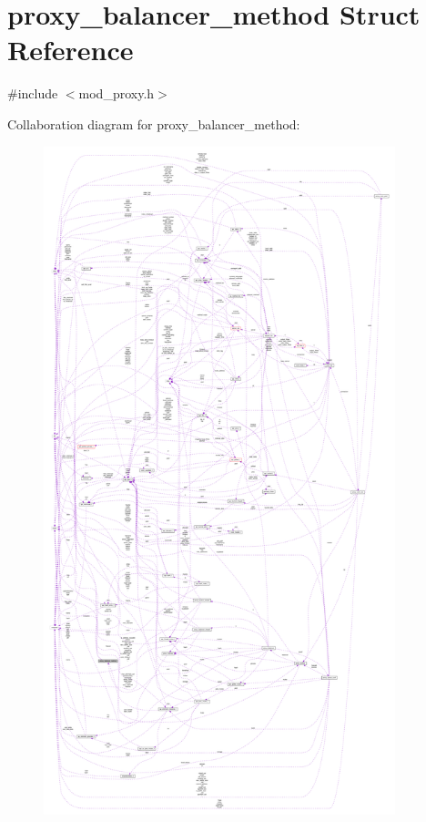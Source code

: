 \hypertarget{structproxy__balancer__method}{}\section{proxy\+\_\+balancer\+\_\+method Struct Reference}
\label{structproxy__balancer__method}


{\ttfamily \#include $<$mod\+\_\+proxy.\+h$>$}



Collaboration diagram for proxy\+\_\+balancer\+\_\+method\+:
\nopagebreak
\begin{figure}[H]
\begin{center}
\leavevmode
\includegraphics[height=550pt]{structproxy__balancer__method__coll__graph}
\end{center}
\end{figure}
